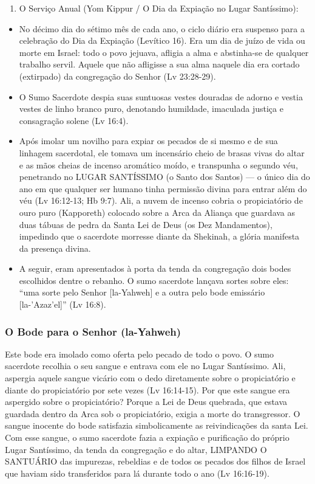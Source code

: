 \begin{enumerate}
  \item O Serviço Anual (Yom Kippur / O Dia da Expiação no Lugar Santíssimo):
\end{enumerate}

\begin{itemize}
  \item No décimo dia do sétimo mês de cada ano, o ciclo diário era suspenso para a celebração do Dia da Expiação (Levítico 16). Era um dia de juízo de vida ou morte em Israel: todo o povo jejuava, afligia a alma e abstinha-se de qualquer trabalho servil. Aquele que não afligisse a sua alma naquele dia era cortado (extirpado) da congregação do Senhor (Lv 23:28-29).
  \item O Sumo Sacerdote despia suas suntuosas vestes douradas de adorno e vestia vestes de linho branco puro, denotando humildade, imaculada justiça e consagração solene (Lv 16:4).
  \item Após imolar um novilho para expiar os pecados de si mesmo e de sua linhagem sacerdotal, ele tomava um incensário cheio de brasas vivas do altar e as mãos cheias de incenso aromático moído, e transpunha o segundo véu, penetrando no LUGAR SANTÍSSIMO (o Santo dos Santos) — o único dia do ano em que qualquer ser humano tinha permissão divina para entrar além do véu (Lv 16:12-13; Hb 9:7). Ali, a nuvem de incenso cobria o propiciatório de ouro puro (Kapporeth) colocado sobre a Arca da Aliança que guardava as duas tábuas de pedra da Santa Lei de Deus (os Dez Mandamentos), impedindo que o sacerdote morresse diante da Shekinah, a glória manifesta da presença divina.
  \item A seguir, eram apresentados à porta da tenda da congregação dois bodes escolhidos dentre o rebanho. O sumo sacerdote lançava sortes sobre eles: ``uma sorte pelo Senhor [la-Yahweh] e a outra pelo bode emissário [la-'Azaz'el]'' (Lv 16:8).
\end{itemize}


\subsubsection*{O Bode para o Senhor (la-Yahweh)}
Este bode era imolado como oferta pelo pecado de todo o povo. O sumo sacerdote recolhia o seu sangue e entrava com ele no Lugar Santíssimo. Ali, aspergia aquele sangue vicário com o dedo diretamente sobre o propiciatório e diante do propiciatório por sete vezes (Lv 16:14-15). Por que este sangue era aspergido sobre o propiciatório? Porque a Lei de Deus quebrada, que estava guardada dentro da Arca sob o propiciatório, exigia a morte do transgressor. O sangue inocente do bode satisfazia simbolicamente as reivindicações da santa Lei. Com esse sangue, o sumo sacerdote fazia a expiação e purificação do próprio Lugar Santíssimo, da tenda da congregação e do altar, LIMPANDO O SANTUÁRIO das impurezas, rebeldias e de todos os pecados dos filhos de Israel que haviam sido transferidos para lá durante todo o ano (Lv 16:16-19).

